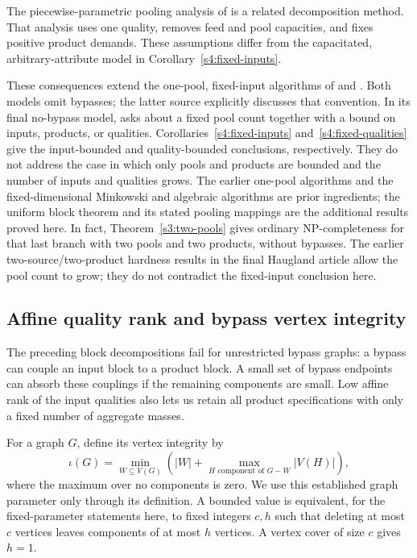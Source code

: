 The piecewise-parametric pooling analysis of
\citet[Assumption~2.2]{s3:baltean2018} is a related decomposition
method. That analysis uses one quality, removes feed and pool
capacities, and fixes positive product demands. These assumptions
differ from the capacitated, arbitrary-attribute model in
Corollary~\ref{s4:fixed-inputs}.

These consequences extend the one-pool, fixed-input algorithms of
\citet[Theorem~1]{s4:boland2017} and
\citet[Theorem~4.1]{s3:haugland-hendrix2016}. Both models omit bypasses;
the latter source explicitly discusses that convention. In its final
no-bypass model, \citet[Section~6, p.~214]
{haugland2016-the-computational-complexity-of-the} asks about a fixed
pool count together with a bound on inputs, products, or qualities.
Corollaries~\ref{s4:fixed-inputs} and~\ref{s4:fixed-qualities} give the
input-bounded and quality-bounded conclusions, respectively.
They do not address the case in which only pools and products are
bounded and the number of inputs and qualities grows. The earlier
one-pool algorithms and the fixed-dimensional Minkowski and algebraic
algorithms are prior ingredients; the uniform block theorem and its
stated pooling mappings are the additional results proved here.
In fact, Theorem~\ref{s3:two-pools} gives ordinary NP-completeness for
that last branch with two pools and two products, without bypasses.
The earlier two-source/two-product hardness results in the final
Haugland article allow the pool count to grow; they do not contradict
the fixed-input conclusion here.

\subsection{Affine quality rank and bypass vertex integrity}
\label{s4:bypass-structure}

The preceding block decompositions fail for unrestricted bypass graphs:
a bypass can couple an input block to a product block. A small set of
bypass endpoints can absorb these couplings if the remaining components
are small. Low affine rank of the input qualities also lets us retain
all product specifications with only a fixed number of aggregate masses.

For a graph $G$, define its vertex integrity by
\[
 \iota(G)=\min_{W\subseteq V(G)}
 \left(|W|+\max_{H\text{ component of }G-W}|V(H)|\right),
\]
where the maximum over no components is zero. We use this established
graph parameter only through its definition. A bounded value is
equivalent, for the fixed-parameter statements here, to fixed integers
$c,h$ such that deleting at most $c$ vertices leaves components of at
most $h$ vertices. A vertex cover of size $c$ gives $h=1$.

